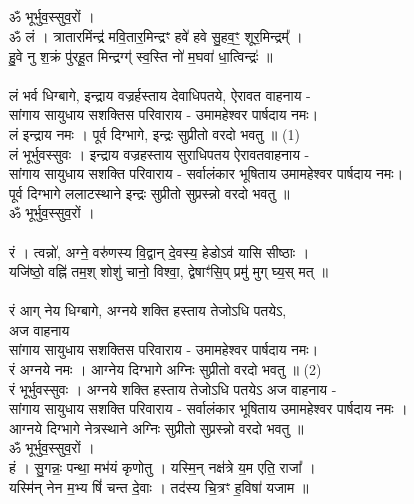 \subsection{}
ॐ भूर्भुव॒स्सुव॒रों ।\\
ॐ लं । त्रातारमिंन्द्र॑ मवि॒तार॒मिन्द्रꣳ हवे॑ हवे सु॒हव॒ꣳ॒ शूर॒मिन्द्रम्᳚ । \\
हु॒वे नु श॒क्रं पु॑रहू॒त मिन्द्रग्ग्॑ स्व॒स्ति नो॑ म॒घवा॑ धा॒त्विन्द्रः॑ ॥\\
\\
लं भर्व धिग्बागे, इन्द्राय वज्रर्हस्ताय देवाधिपतये, ऐरावत वाहनाय - \\
सांगाय सायुधाय सशक्तिस परिवाराय -  उमामहेश्वर पार्षदाय नमः।\\
लं इन्द्राय नमः ।  पूर्व दिग्भागे, इन्द्रः सुप्रीतो  वरदो भवतु ॥  (1)\\
{\small लं भूर्भुवस्सुवः । इन्द्राय वज्रहस्ताय सुराधिपतय ऐरावतवाहनाय -\\
सांगाय सायुधाय सशक्ति परिवाराय - सर्वालंकार भूषिताय उमामहेश्वर पार्षदाय नमः।\\
पूर्व दिग्भागे ललाटस्थाने इन्द्रः सुप्रीतो सुप्रस्न्नो वरदो भवतु ॥}\\
ॐ भूर्भुव॒स्सुव॒रों ।\\
\\
रं । त्वन्नो॑, अग्ने॒ वरु॑णस्य वि॒द्वान् दे॒वस्य॒ हेडोऽव॑ यासि सीष्ठाः ।\\
यजि॑ष्ठो॒  वह्नि॑ तम॒श् शोशु॑ चानो॒ विश्वा॒, द्वेषाꣳ॑सि॒प् प्रमु॑ मुग् घ्य॒स् मत् ॥ \\
\\
रं आग् नेय धिग्बागे, अग्नये शक्ति हस्ताय तेजोऽधि पतयेऽ,\\
\hspace*{10cm} अज वाहनाय\\
सांगाय सायुधाय सशक्तिस परिवाराय - उमामहेश्वर पार्षदाय नमः।\\
रं अग्नये नमः । आग्नेय दिग्भागे अग्निः सुप्रीतो  वरदो भवतु ॥ (2)\\
{\small रं भूर्भुवस्सुवः । अग्नये शक्ति हस्ताय तेजोऽधि पतयेऽ अज वाहनाय -\\
सांगाय सायुधाय सशक्ति परिवाराय - सर्वालंकार भूषिताय उमामहेश्वर पार्षदाय नमः ।\\
आग्नये दिग्भागे नेत्रस्थाने अग्निः सुप्रीतो सुप्रस्न्नो वरदो भवतु ॥}\\
ॐ भूर्भुव॒स्सुव॒रों ।\\
हं । सु॒गन्नः॒ पन्था॒ मभ॑यं कृणोतु । यस्मि॒न् नक्ष॑त्रे य॒म एति॒ राजा᳚ ।\\
यस्मि॑न् नेन म॒भ्य षिं॑ चन्त दे॒वाः । तद॑स्य चि॒त्रꣳ ह॒विषा॑ यजाम ॥\\
